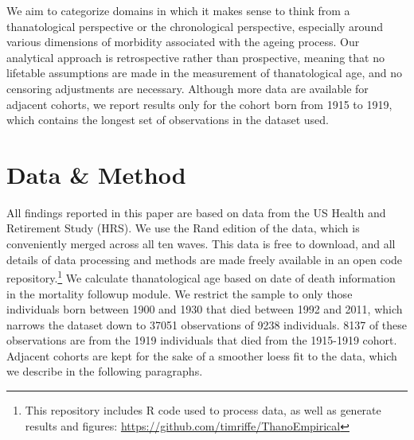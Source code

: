 \documentclass{article}
\begin{document}


We aim to categorize domains in which it makes
sense to think from a thanatological perspective or the chronological
perspective, especially around various dimensions of morbidity associated with
the ageing process. Our analytical approach is retrospective rather than
prospective, meaning that no lifetable assumptions are made in the measurement
of thanatological age, and no censoring adjustments are necessary. Although more
data are available for adjacent cohorts, we report results only for the cohort
born from 1915 to 1919, which contains the longest set of observations in the
dataset used.

\section*{Data \& Method}

All findings reported in this paper are based on data from the US Health and
Retirement Study (HRS). We use the Rand edition of the data, which is
conveniently merged across all ten waves. This data is free to download, and all
details of data processing and methods are made freely available in an open code
repository.\footnote{This
repository includes R code used to process data, as well as generate results and
figures: \url{https://github.com/timriffe/ThanoEmpirical}} We
calculate thanatological age based on date of death information in the mortality followup module. We restrict the sample to only those individuals born between 1900 and 1930 that died between 1992 and 2011, which narrows the dataset down to 37051 observations of 9238 individuals. 8137 of these observations are from the 1919 individuals that died from the 1915-1919 cohort. Adjacent cohorts are kept for the sake of a
smoother loess fit to the data, which we describe in the following paragraphs.
\end{document}
